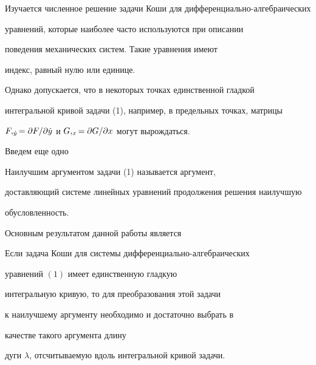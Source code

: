 Изучается численное решение задачи Коши для дифференциально-алгебраических


уравнений, которые наиболее часто используются при описании


поведения механических систем. Такие уравнения имеют


индекс, равный нулю или единице.


Однако допускается, что в некоторых точках единственной гладкой


интегральной кривой задачи (1), например, в предельных точках, матрицы


$F,_{\Dot y}=\partial F/\partial \Dot y$ и $G,_x=\partial G/\partial x$ могут вырождаться.





Введем еще одно





\begin{defn} Наилучшим аргументом задачи (1) называется аргумент,


доставляющий системе линейных уравнений продолжения решения наилучшую


обусловленность.


\end{defn}





Основным результатом данной работы является





\begin{thmnonum} Если задача Коши для системы дифференциально-алгебраических


уравнений $(1)$ имеет единственную гладкую


интегральную кривую, то для преобразования этой задачи


к наилучшему аргументу необходимо и достаточно выбрать в


качестве такого аргумента длину


дуги $\lambda$, отсчитываемую вдоль интегральной кривой задачи.


\end{thmnonum}





